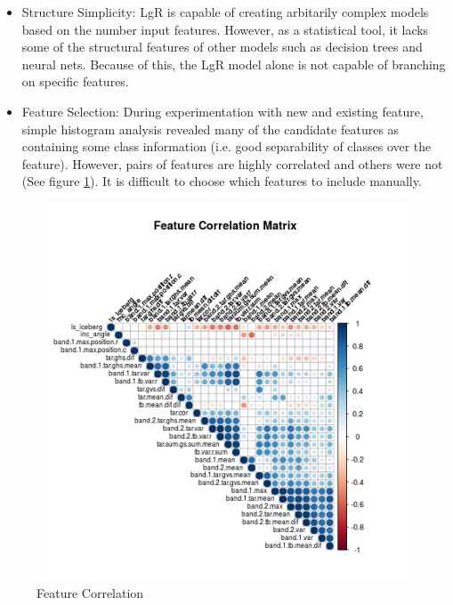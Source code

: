 \documentclass[fleqn,10pt]{SelfArx} %
\begin{document}
\begin{itemize}
	\item{Structure Simplicity:} LgR is capable of creating arbitarily complex models based on the number input features.  However, as a statistical tool, it lacks some of the structural features of other models such as decision trees and neural nets.  Because of this, the LgR model alone is not capable of branching on specific features.
	\item{Feature Selection:} During experimentation with new and existing feature, simple histogram analysis revealed many of the candidate features as containing some class information (i.e. good separability of classes over the feature).  However, pairs of features are highly correlated and others were not (See figure \ref{correlation}).  It is difficult to choose which features to include manually.
\end{itemize}

\begin{figure}
	\includegraphics[width=.9\linewidth]{iceberg/analysis/corr_matrix.png}
	\caption{Feature Correlation}\label{correlation}
\end{figure}
\end{document}
